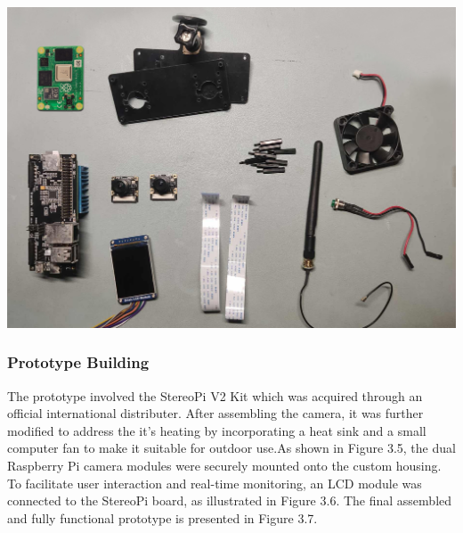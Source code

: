 \begin{center}
	\includegraphics[width=\textwidth]{Parts.png}
\end{center}



\subsubsection{Prototype Building}
The prototype involved the StereoPi V2 Kit which was acquired through an official international distributer. After assembling the camera, it was further modified to address the it's heating by incorporating a heat sink and a small computer fan to make it suitable for outdoor use.As shown in Figure 3.5, the dual Raspberry Pi camera modules were securely mounted onto the custom housing. To facilitate user interaction and real-time monitoring, an LCD module was connected to the StereoPi board, as illustrated in Figure 3.6. The final assembled and fully functional prototype is presented in Figure 3.7.


